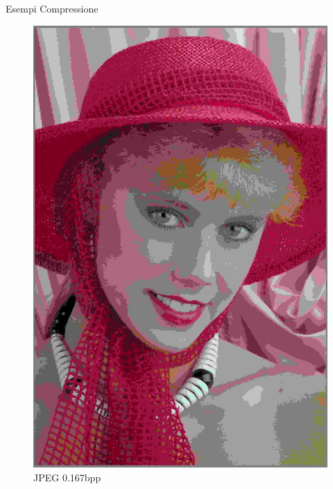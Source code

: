 \begin{frame}{Esempi Compressione}
\begin{figure}[!ht]
\begin{minipage}[]{0.13\linewidth}
            \end{minipage}
            \begin{minipage}[]{0.13\linewidth}
                \centering
                \includegraphics[width=\textwidth]{Immagini/IMAGES/JPEG_1_IMG0004.pdf}
                \caption{JPEG 0.167bpp}
                \label{fig:ExampleJPEG}
            \end{minipage}
            \begin{minipage}[]{0.13\linewidth}
                \centering

\end{minipage}
\end{figure}
\end{frame}
